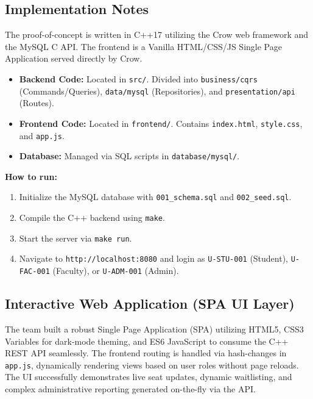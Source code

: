 \documentclass[12pt,a4paper]{article}
\begin{document}
\subsection{Implementation Notes}
The proof-of-concept is written in C++17 utilizing the Crow web framework and the MySQL C API. The frontend is a Vanilla HTML/CSS/JS Single Page Application served directly by Crow.
\begin{itemize}
    \item \textbf{Backend Code:} Located in \texttt{src/}. Divided into \texttt{business/cqrs} (Commands/Queries), \texttt{data/mysql} (Repositories), and \texttt{presentation/api} (Routes).
    \item \textbf{Frontend Code:} Located in \texttt{frontend/}. Contains \texttt{index.html}, \texttt{style.css}, and \texttt{app.js}.
    \item \textbf{Database:} Managed via SQL scripts in \texttt{database/mysql/}.
\end{itemize}
\textbf{How to run:}
\begin{enumerate}
    \item Initialize the MySQL database with \texttt{001\_schema.sql} and \texttt{002\_seed.sql}.
    \item Compile the C++ backend using \texttt{make}.
    \item Start the server via \texttt{make run}.
    \item Navigate to \texttt{http://localhost:8080} and login as \texttt{U-STU-001} (Student), \texttt{U-FAC-001} (Faculty), or \texttt{U-ADM-001} (Admin).
\end{enumerate}

\subsection{Interactive Web Application (SPA UI Layer)}
The team built a robust Single Page Application (SPA) utilizing HTML5, CSS3 Variables for dark-mode theming, and ES6 JavaScript to consume the C++ REST API seamlessly. The frontend routing is handled via hash-changes in \texttt{app.js}, dynamically rendering views based on user roles without page reloads. The UI successfully demonstrates live seat updates, dynamic waitlisting, and complex administrative reporting generated on-the-fly via the API.
\end{document}
